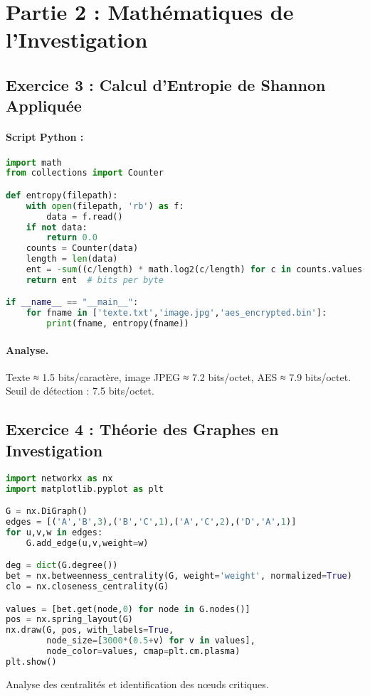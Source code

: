 \documentclass[12pt,a4paper]{article}
\begin{document}
\section*{Partie 2 : Mathématiques de l’Investigation}

\subsection*{Exercice 3 : Calcul d’Entropie de Shannon Appliquée}
\paragraph{Script Python :}
\begin{lstlisting}[language=Python]
import math
from collections import Counter

def entropy(filepath):
    with open(filepath, 'rb') as f:
        data = f.read()
    if not data:
        return 0.0
    counts = Counter(data)
    length = len(data)
    ent = -sum((c/length) * math.log2(c/length) for c in counts.values())
    return ent  # bits per byte

if __name__ == "__main__":
    for fname in ['texte.txt','image.jpg','aes_encrypted.bin']:
        print(fname, entropy(fname))
\end{lstlisting}
\paragraph{Analyse.} Texte ≈ 1.5 bits/caractère, image JPEG ≈ 7.2 bits/octet, AES ≈ 7.9 bits/octet. Seuil de détection : 7.5 bits/octet.

\subsection*{Exercice 4 : Théorie des Graphes en Investigation}
\begin{lstlisting}[language=Python]
import networkx as nx
import matplotlib.pyplot as plt

G = nx.DiGraph()
edges = [('A','B',3),('B','C',1),('A','C',2),('D','A',1)]
for u,v,w in edges:
    G.add_edge(u,v,weight=w)

deg = dict(G.degree())
bet = nx.betweenness_centrality(G, weight='weight', normalized=True)
clo = nx.closeness_centrality(G)

values = [bet.get(node,0) for node in G.nodes()]
pos = nx.spring_layout(G)
nx.draw(G, pos, with_labels=True,
        node_size=[3000*(0.5+v) for v in values],
        node_color=values, cmap=plt.cm.plasma)
plt.show()
\end{lstlisting}
Analyse des centralités et identification des nœuds critiques.
\end{document}
